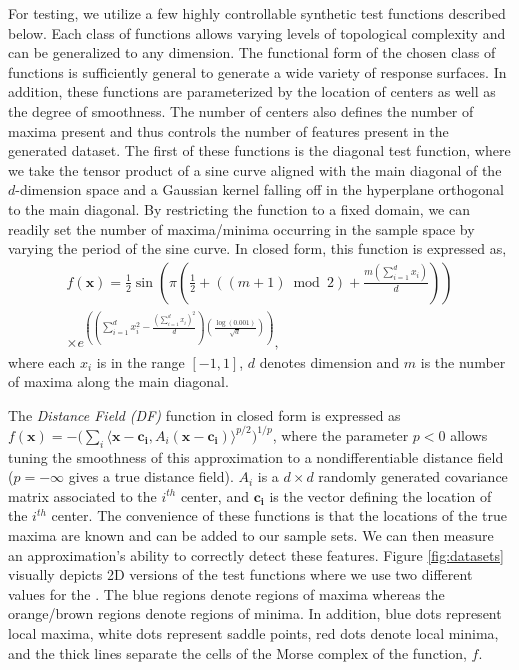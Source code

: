 For testing, we utilize a few highly controllable synthetic test functions described below.
%
Each class of functions allows varying levels of topological complexity and can be generalized to any dimension.
%
The functional form of the chosen class of functions is sufficiently general to generate a wide variety of response surfaces.
%
In addition, these functions are parameterized by the location of centers as well as the degree of smoothness.
%
The number of centers also defines the number of maxima present and thus controls the number of features present in the generated dataset.
%
The first of these functions is the diagonal test function, where we take the tensor product of a sine curve aligned with the main diagonal of the $d$-dimension space and a Gaussian kernel falling off in the hyperplane orthogonal to the main diagonal.
%
By restricting the function to a fixed domain, we can readily set the number of maxima/minima occurring in the sample space by varying the period of the sine curve.
%
In closed form, this function is expressed as,
%
\begin{eqnarray*}
    f(\mathbf{x}) = \frac{1}{2}\sin\left(\pi\left(\frac{1}{2} + \left((m+1)
      \bmod{2}\right) + \frac{m\left(\sum_{i=1}^{d}x_i\right)}{d}\right)\right)
    \\
     \times e^{\left(\left(\sum_{i=1}^{d}x_i^2 -\frac{\left(\sum_{i=1}^{d}
      x_i\right)^2}{d}\right)\left(\frac{\log(0.001)}{\sqrt{d}}\right)\right)},
\end{eqnarray*}
%
where each $x_i$ is in the range $[-1,1]$, $d$ denotes dimension and $m$ is the number of maxima along the main diagonal.

The \emph{Distance Field (DF)} function in closed form is expressed as $f(\mathbf{x}) = -\bigl(\sum_i \langle\mathbf{x}-\mathbf{c_i},A_i(\mathbf{x}-\mathbf{c_i})\rangle^{p/2}\bigr)^{1/p}$, where the parameter $p < 0$ allows tuning the smoothness of this approximation to a nondifferentiable distance field ($p = -\infty$ gives a true distance field).
%
$A_i$ is a $d \times d$ randomly generated covariance matrix associated to the $i^{th}$ center, and $\mathbf{c_i}$ is the vector defining the location of the $i^{th}$ center.
%
The convenience of these functions is that the locations of the true maxima are known and can be added to our sample sets.
%
We can then measure an approximation's ability to correctly detect these features.
%
Figure \ref{fig:datasets} visually depicts 2D versions of the test functions where we use two different values for the .
%
The blue regions denote regions of maxima whereas the orange/brown regions denote regions of minima.
In addition, blue dots represent local maxima, white dots represent saddle points, red dots denote local minima, and the thick lines separate the cells of the Morse complex of the function, $f$.

